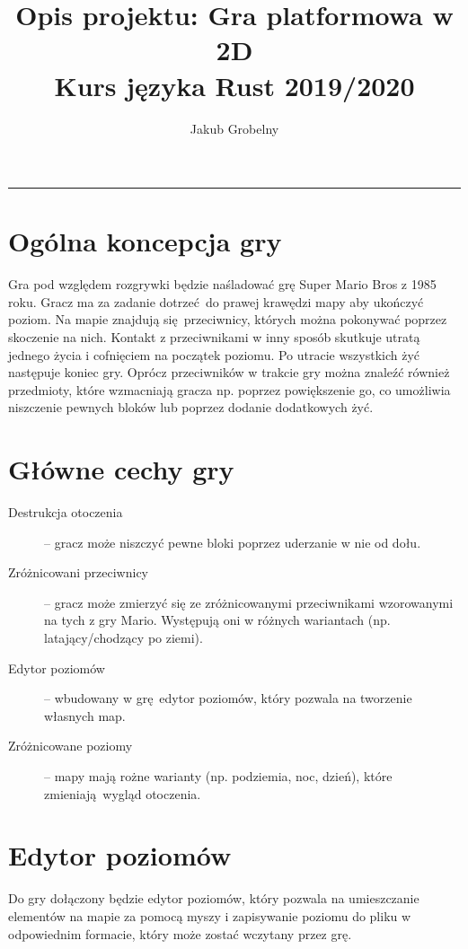 \documentclass[12pt, a4paper, oneside]{article}
\title{%
    \textbf{Opis projektu: Gra platformowa w 2D} \\
    \large Kurs języka Rust 2019/2020
}
\author{\Large Jakub Grobelny}
\date{}
\begin{document}
\begin{titlepage}
    \maketitle
\end{titlepage}

\noindent\rule{\textwidth}{1pt}


\section*{Ogólna koncepcja gry}

Gra pod względem rozgrywki będzie naśladować grę Super Mario Bros z 1985 roku. 
Gracz ma za zadanie dotrzeć do prawej krawędzi mapy aby ukończyć poziom. Na 
mapie znajdują się przeciwnicy, których można pokonywać poprzez skoczenie na 
nich. Kontakt z przeciwnikami w inny sposób skutkuje utratą jednego życia i 
cofnięciem na początek poziomu. Po utracie wszystkich żyć następuje koniec gry. 
Oprócz przeciwników w trakcie gry można znaleźć również przedmioty, które 
wzmacniają gracza np. poprzez powiększenie go, co umożliwia niszczenie pewnych 
bloków lub poprzez dodanie dodatkowych żyć.

\section*{Główne cechy gry}

\begin{description}
    \item[Destrukcja otoczenia] -- gracz może niszczyć pewne bloki poprzez 
    uderzanie w nie od dołu.
    \item[Zróżnicowani przeciwnicy] -- gracz może zmierzyć się ze 
    zróżnicowanymi przeciwnikami wzorowanymi na tych z gry Mario. Występują oni 
    w różnych wariantach (np. latający/chodzący po ziemi).
    \item[Edytor poziomów] -- wbudowany w grę edytor poziomów, który pozwala na 
    tworzenie własnych map.
    \item[Zróżnicowane poziomy] -- mapy mają rożne warianty (np. podziemia, noc,
     dzień), które zmieniają wygląd otoczenia.
\end{description}

\section*{Edytor poziomów}

Do gry dołączony będzie edytor poziomów, który pozwala na umieszczanie 
elementów na mapie za pomocą myszy i zapisywanie poziomu do pliku w odpowiednim 
formacie, który może zostać wczytany przez grę.
\end{document}

